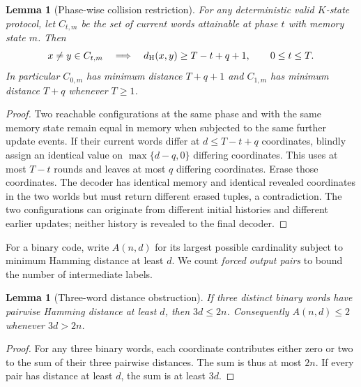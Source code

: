 \documentclass[11pt,a4paper]{article}
\newtheorem{lemma}[theorem]{Lemma}
\begin{document}
\begin{lemma}[Phase-wise collision restriction]\label{lem:phase}
For any deterministic valid $K$-state protocol, let $C_{t,m}$ be the set of current words attainable at phase $t$ with memory state $m$. Then
\[
 x\ne y\in C_{t,m}\quad\Longrightarrow\quad
 d_{\rm H}(x,y)\ge T-t+q+1,
 \qquad 0\le t\le T.
\]
In particular $C_{0,m}$ has minimum distance $T+q+1$ and $C_{1,m}$ has minimum distance $T+q$ whenever $T\ge1$.
\end{lemma}
\begin{proof}
Two reachable configurations at the same phase and with the same memory state remain equal in memory when subjected to the same further update events. If their current words differ at $d\le T-t+q$ coordinates, blindly assign an identical value on $\max\{d-q,0\}$ differing coordinates. This uses at most $T-t$ rounds and leaves at most $q$ differing coordinates. Erase those coordinates. The decoder has identical memory and identical revealed coordinates in the two worlds but must return different erased tuples, a contradiction. The two configurations can originate from different initial histories and different earlier updates; neither history is revealed to the final decoder.
\end{proof}

For a binary code, write $A(n,d)$ for its largest possible cardinality subject to minimum Hamming distance at least $d$. We count \emph{forced output pairs} to bound the number of intermediate labels.

\begin{lemma}[Three-word distance obstruction]\label{lem:three}
If three distinct binary words have pairwise Hamming distance at least $d$, then $3d\le2n$. Consequently $A(n,d)\le2$ whenever $3d>2n$.
\end{lemma}
\begin{proof}
For any three binary words, each coordinate contributes either zero or two to the sum of their three pairwise distances. The sum is thus at most $2n$. If every pair has distance at least $d$, the sum is at least $3d$.
\end{proof}
\end{document}

